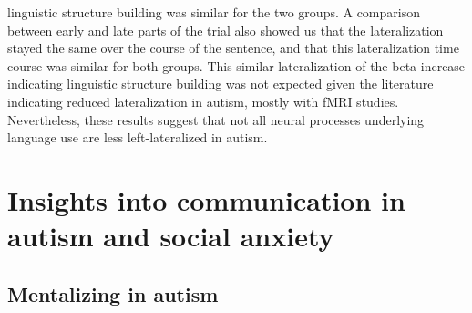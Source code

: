 linguistic structure building was similar for the two groups. A comparison between early and late parts of the trial also showed us that the lateralization stayed the same over the course of the sentence, and that this lateralization time course was similar for both groups. This similar lateralization of the beta increase indicating linguistic structure building was not expected given the literature indicating reduced lateralization in autism, mostly with fMRI studies. Nevertheless, these results suggest that not all neural processes underlying language use are less left-lateralized in autism.  

\section*{Insights into communication in autism and social anxiety}

\subsection*{Mentalizing in autism}

